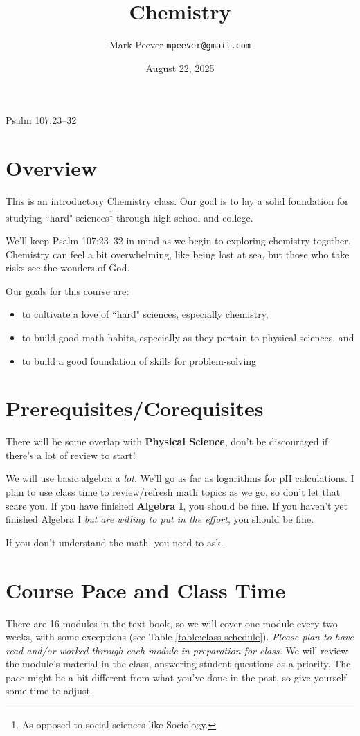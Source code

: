 \documentclass[11pt, oneside]{article}   	%
\title{Chemistry}
\author{Mark Peever \texttt{mpeever@gmail.com}}
\date{August 22, 2025}
\begin{document}
\maketitle

\begin{center}
Psalm 107:23--32
\end{center}

\section{Overview}
This is an introductory Chemistry class. Our goal is to lay a solid foundation for studying ``hard" sciences\footnote{As opposed to social sciences like Sociology.} through high school and college. 

We'll keep Psalm 107:23--32 in mind as we begin to exploring chemistry together. Chemistry can feel a bit overwhelming, like being lost at sea, but those who take risks see the wonders of God.

Our goals for this course are:
\begin{itemize}
\item to cultivate a love of ``hard" sciences, especially chemistry,
\item to build good math habits, especially as they pertain to physical sciences, and
\item to build a good foundation of skills for problem-solving
\end{itemize}

\section{Prerequisites/Corequisites}
There will be some overlap with \textbf{Physical Science}, don't be discouraged if there's a lot of review to start!

We will use basic algebra a \emph{lot}. 
We'll go as far as logarithms for pH calculations.  
I plan to use class time to review/refresh math topics as we go, so don't let that scare you.
If you have finished \textbf{Algebra I}, you should be fine. 
If you haven't yet finished Algebra I \emph{but are willing to put in the effort}, you should be fine.

If you don't understand the math, you need to ask.

\section{Course Pace and Class Time}
There are 16 modules in the text book, so we will cover one module every two weeks, with some exceptions (see Table \ref{table:class-schedule}). \emph{Please plan to have read and/or worked through each module in preparation for class.}  We will review the module's material in the class, answering student questions as a priority. The pace might be a bit different from what you've done in the past, so give yourself some time to adjust.
\end{document}
